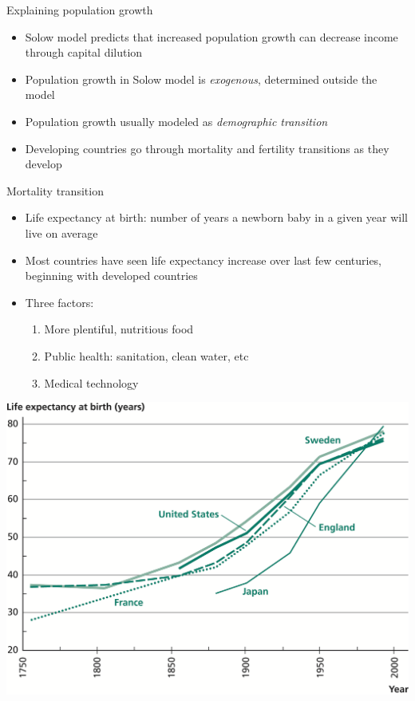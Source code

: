 \documentclass[10pt]{beamer}
\begin{document}
\begin{frame}[label={sec:orga0ff42d}]{}
\alert{Explaining population growth}
\begin{itemize}
\item Solow model predicts that increased population growth can decrease income through capital dilution
\item Population growth in Solow model is \emph{exogenous}, determined outside the model
\item Population growth usually modeled as \emph{demographic transition}
\item Developing countries go through mortality and fertility transitions as they develop
\end{itemize}
\end{frame}

\begin{frame}[label={sec:org861daaf}]{}
\alert{Mortality transition}
\begin{itemize}
\item Life expectancy at birth: number of years a newborn baby in a given year will live on average
\item Most countries have seen life expectancy increase over last few centuries, beginning with developed countries
\item Three factors:
\begin{enumerate}
\item More plentiful, nutritious food
\item Public health: sanitation, clean water, etc
\item Medical technology
\end{enumerate}
\end{itemize}
\end{frame}

\begin{frame}[label={sec:org1125624}]{}
\begin{center}
\includegraphics[width=.75\textwidth]{./img/4.8.png}
\end{center}
\end{frame}
\end{document}

